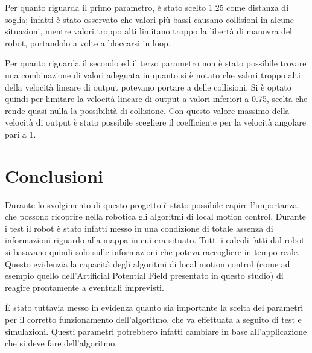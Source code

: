 \documentclass[Lau, binding=0.6cm, oneside]{sapthesis}
\begin{document}
Per quanto riguarda il primo parametro, è stato scelto 1.25 come distanza di soglia; infatti è stato osservato che valori più bassi causano collisioni in alcune situazioni, mentre valori troppo alti limitano troppo la libertà di manovra del robot, portandolo a volte a bloccarsi in loop.

Per quanto riguarda il secondo ed il terzo parametro non è stato possibile trovare una combinazione di valori adeguata in quanto si è notato che valori troppo alti della velocità lineare di output potevano portare a delle collisioni.
Si è optato quindi per limitare la velocità lineare di output a valori inferiori a 0.75, scelta che rende quasi nulla la possibilità di collisione.
Con questo valore massimo della velocità di output è stato possibile scegliere il coefficiente per la velocità angolare pari a 1.

\chapter{Conclusioni}
Durante lo svolgimento di questo progetto è stato possibile capire l'importanza che possono ricoprire nella robotica gli algoritmi di local motion control.
Durante i test il robot è stato infatti messo in una condizione di totale assenza di informazioni riguardo alla mappa in cui era situato.
Tutti i calcoli fatti dal robot si basavano quindi solo sulle informazioni che poteva raccogliere in tempo reale.
Questo evidenzia la capacità degli algoritmi di local motion control (come ad esempio quello dell'Artificial Potential Field presentato in questo studio) di reagire prontamente a eventuali imprevisti.

È stato tuttavia messo in evidenza quanto sia importante la scelta dei parametri per il corretto funzionamento dell'algoritmo, che va effettuata a seguito di test e simulazioni.
Questi parametri potrebbero infatti cambiare in base all'applicazione che si deve fare dell'algoritmo.



\end{document}
